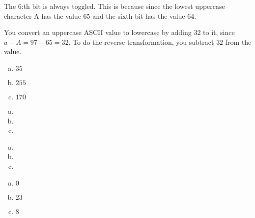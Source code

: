 \begin{Answer}[ref={ascii-uppercase}]

  The 6:th bit is always toggled. This is because since the lowest
  uppercase character A has the value 65 and the sixth bit has the
  value $64$.
\end{Answer}

\begin{Answer}[ref={uppercase-conv}]

  You convert an uppercase ASCII value to lowercase by adding $32$ to
  it, since $a - A = 97 - 65 = 32$. To do the reverse transformation,
  you subtract $32$ from the value.

\end{Answer}

\begin{Answer}[ref={hex-to-n}]

  \begin{enumerate}[(a)]
  \item $35$
  \item $255$
  \item $170$
  \end{enumerate}

\end{Answer}

\begin{Answer}[ref={n-to-hex}]

  \begin{enumerate}[(a)]
  \item {}
  \item {}
  \item {}
  \end{enumerate}

\end{Answer}

\begin{Answer}[ref={boolean}]

  \begin{enumerate}[(a)]
  \item \False
  \item \True
  \item \False
  \end{enumerate}

\end{Answer}

\begin{Answer}[ref={bitand}]
  \begin{enumerate}[(a)]
  \item $0$
  \item $23$
  \item $8$
  \end{enumerate}
\end{Answer}

